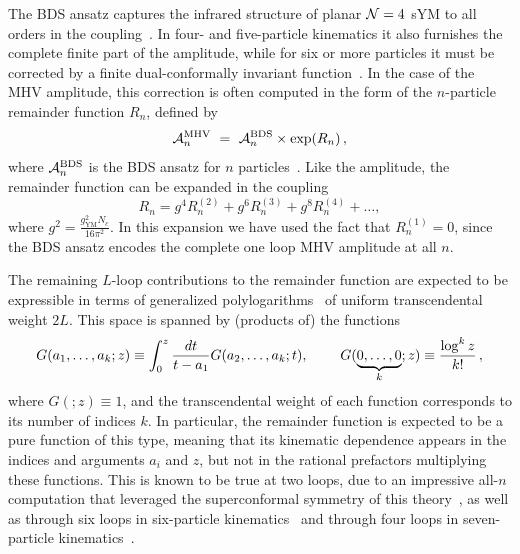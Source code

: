 \documentclass[12pt]{article}
\begin{document}
The BDS ansatz captures the infrared structure of planar ${\cal N} = 4$ sYM to all orders in the coupling~\cite{Bern:2005iz}. In four- and five-particle kinematics it also furnishes the complete finite part of the amplitude, while for six or more particles it must be corrected by a finite dual-conformally invariant function~\cite{Drummond:2007au,Bern:2008ap,Drummond:2008aq}. In the case of the MHV amplitude, this correction is often computed in the form of the $n$-particle remainder function $R_n$, defined by
\begin{equation} \label{eq:remainder_function}
\mathcal{A}_n^{\rm MHV}\ =\ \mathcal{A}_n^{\rm BDS}  \times \exp(R_n)\,,
\end{equation}
where $\mathcal{A}_n^{\rm BDS}$ is the BDS ansatz for $n$ particles~\cite{Bern:2005iz}. Like the amplitude, the remainder function can be expanded in the coupling
\begin{equation}
R_n = g^4 R_n^{(2)} + g^6 R_n^{(3)} + g^8 R_n^{(4)} + \dots ,
\end{equation}
where $g^2 = \frac{g_{\text{YM}}^2 N_c}{16 \pi^2}$. In this expansion we have used the fact that $R_n^{(1)} = 0$, since the BDS ansatz encodes the complete one loop MHV amplitude at all $n$. 

The remaining $L$-loop contributions to the remainder function are expected to be expressible in terms of generalized polylogarithms~\cite{Chen,FBThesis,Gonch} of uniform transcendental weight $2L$. This space is spanned by (products of) the functions
\begin{equation} \label{eq:multiple_polylogs}
G(a_1, \dots, a_k; z) \equiv \int_0^z \frac{dt}{t-a_1} G(a_2,\dots,a_k; t), \hspace{0.8cm} G(\underbrace{0,\dots,0}_k;z) \equiv \frac{\log^k z}{k!}\, ,
\end{equation}
where $G(;z) \equiv 1$, and the transcendental weight of each function corresponds to its number of indices $k$. In particular, the remainder function is expected to be a pure function of this type, meaning that its kinematic dependence appears in the indices and arguments $a_i$ and $z$, but not in the rational prefactors multiplying these functions. This is known to be true at two loops, due to an impressive all-$n$ computation that leveraged the superconformal symmetry of this theory~\cite{CaronHuot:2011ky}, as well as through six loops in six-particle kinematics~\cite{Dixon:2013eka,Dixon:2014voa,Caron-Huot:2016owq,cosmic_galois_paper} and through four loops in seven-particle kinematics~\cite{Drummond:2014ffa,Dixon:2016nkn}. 
\end{document}
